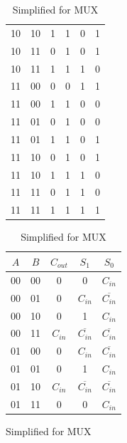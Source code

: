 \documentclass{article}
\begin{document}
\begin{table}[H]
\begin{subfigure}{0.4\linewidth}
\begin{tabular}{c c c | c c c}
            10  & 10  & 1        & 1         & 0     & 1     \\
            10  & 11  & 0        & 1         & 0     & 1     \\
            10  & 11  & 1        & 1         & 1     & 0     \\
            11  & 00  & 0        & 0         & 1     & 1     \\
            11  & 00  & 1        & 1         & 0     & 0     \\
            11  & 01  & 0        & 1         & 0     & 0     \\
            11  & 01  & 1        & 1         & 0     & 1     \\
            11  & 10  & 0        & 1         & 0     & 1     \\
            11  & 10  & 1        & 1         & 1     & 0     \\
            11  & 11  & 0        & 1         & 1     & 0     \\
            11  & 11  & 1        & 1         & 1     & 1     \\
            \bottomrule
        \end{tabular}
    \end{subfigure}
    \begin{subfigure}{0.4\linewidth}
        \caption{Simplified for MUX}
        \label{tab:mux-simplified}
        \begin{tabular}{c c | c c c}
            \toprule
            $A$ & $B$ & $C_{out}$ & $S_1$               & $S_0$               \\
            \midrule
            00  & 00  & 0         & 0                   & $C_{in}$            \\
            00  & 01  & 0         & $C_{in}$            & $\overline{C_{in}}$ \\
            00  & 10  & 0         & 1                   & $C_{in}$            \\
            00  & 11  & $C_{in}$  & $\overline{C_{in}}$ & $\overline{C_{in}}$ \\
            01  & 00  & 0         & $C_{in}$            & $\overline{C_{in}}$ \\
            01  & 01  & 0         & 1                   & $C_{in}$            \\
            01  & 10  & $C_{in}$  & $\overline{C_{in}}$ & $\overline{C_{in}}$ \\
            01  & 11  & 0         & 0                   & $C_{in}$            \\

\end{tabular}
\end{subfigure}
\end{table}
\end{document}
